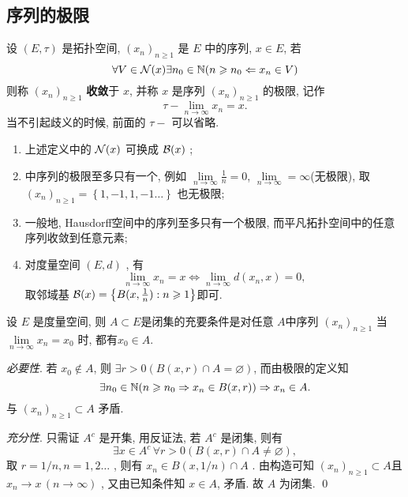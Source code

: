  \subsection{序列的极限}
 \begin{Def}[极限]\label{def:极限}
       设 $ (E, \tau) $ 是拓扑空间, $ (x_{n})_{n\geqslant 1} $ 是 $ E $ 中的序列,  $ x\in E $, 若
       \[
            \forall V\in\mathcal{N}(x)\exists n_{0}\in\mathbb{N}(n\geqslant n_{0}\Leftarrow x_{n}\in V)
       \]
       则称 $ (x_{n})_{n\geqslant1} $ \textbf{收敛}于 $ x $, 并称 $ x $ 是序列 $ (x_{n})_{n\geqslant1} $ 的极限, 记作
       \[
            \tau-\lim_{n\to \infty}x_{n}=x. 
       \] 
       当不引起歧义的时候, 前面的 $ \tau- $ 可以省略. 
 \end{Def}
\begin{Rmk}
     \begin{enumerate}[(1)]
          \item 上述定义中的 $ \mathcal{N}(x) $ 可换成 $ \mathcal{B}(x) $ ;
          \item \R 中序列的极限至多只有一个, 例如 $\lim\limits_{n\to\infty}\frac{1}{n}=0 $, $ \lim\limits_{n\to\infty} =\infty$(无极限), 取 $ (x_{n})_{n\geqslant1}=\left\{ 1, -1, 1,  -1\ldots \right\} $ 也无极限;
          \item 一般地, Hausdorff空间中的序列至多只有一个极限, 而平凡拓扑空间中的任意序列收敛到任意元素;
          \item 对度量空间 $ (E, d) $ , 有
          \[
               \lim_{n\to \infty}x_{n}=x \Leftrightarrow \lim_{n\to\infty}d(x_{n}, x)=0, 
          \]
          取邻域基 $ \mathcal{B}(x)=\left\{ B(x, \frac{1}{n}): n\geqslant1 \right\} $即可.  
     \end{enumerate}
\end{Rmk}
\begin{Prop}
     设 $ E $ 是度量空间, 则 $ A\subset E $是闭集的充要条件是对任意 $ A $中序列  $ (x_{n})_{n\geqslant1} $ 当 $ \lim\limits_{n\to\infty}x_{n}=x_{0} $ 时, 都有$ x_{0}\in A $.  
\end{Prop}
\begin{Prf}
     \textit{必要性}. 若 $ x_{0}\notin A $, 则 $ \exists r>0 (B(x, r)\cap A=\varnothing) $, 而由极限的定义知 
     \[
          \exists n_{0}\in\mathbb{N}(n\geqslant n_{0}\Rightarrow x_{n}\in B(x, r))\Rightarrow x_{n}\in A. 
     \]
     与 $ (x_{n})_{n\geqslant1}\subset A $ 矛盾. 

     \textit{充分性}. 只需证 $ A^{c} $ 是开集, 用反证法, 若 $ A^{c} $ 是闭集, 则有
     \[
          \exists x\in A^{c}\,\forall r>0(B(x, r)\cap A\neq\varnothing),
     \]
     取 $ r=1/n, n=1, 2\ldots $ , 则有 $ x_{n}\in B(x, 1/n)\cap A $ . 由构造可知 $ (x_{n})_{n\geqslant1}\subset A $且 $ x_{n}\to x\,(n\to\infty) $  , 又由已知条件知 $ x\in A $, 矛盾. 故 $ A $ 为闭集. \qed 
\end{Prf}
